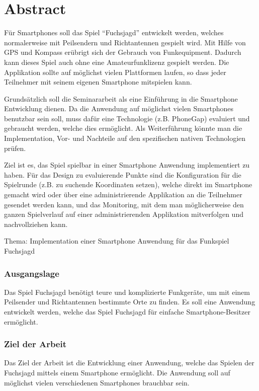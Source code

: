 
\newpage
\section{Abstract} %
\label{sec:Abstract}
Für Smartphones soll das Spiel "`Fuchsjagd"' entwickelt werden, welches normalerweise mit Peilsendern und Richtantennen gespielt wird. Mit Hilfe von GPS und Kompass erübrigt sich der Gebrauch von Funkequipment.
Dadurch kann dieses Spiel auch ohne eine Amateurfunklizenz gespielt werden. Die Applikation sollte auf möglichst vielen Plattformen laufen, so dass jeder Teilnehmer mit seinem eigenen Smartphone mitspielen kann.

Grundsätzlich soll die Seminararbeit als eine Einführung in die Smartphone Entwicklung dienen. Da die Anwendung auf möglichst vielen Smartphones benutzbar sein soll, muss dafür eine Technologie (z.B. PhoneGap) evaluiert und gebraucht werden, welche dies ermöglicht. Als Weiterführung könnte man die Implementation, Vor- und Nachteile auf den spezifischen nativen Technologien prüfen.  

Ziel ist es, das Spiel spielbar in einer Smartphone Anwendung implementiert zu haben. Für das Design zu evaluierende Punkte sind die Konfiguration für die Spielrunde (z.B. zu suchende Koordinaten setzen), welche direkt im Smartphone gemacht wird oder über eine administrierende Applikation an die Teilnehmer gesendet werden kann, und das Monitoring, mit dem man möglicherweise den ganzen Spielverlauf auf einer administrierenden Applikation mitverfolgen und nachvollziehen kann.

Thema: Implementation einer Smartphone Anwendung für das Funkspiel Fuchsjagd

\subsubsection{Ausgangslage} %
\label{ssub:Ausgangslage}
Das Spiel Fuchsjagd benötigt teure und komplizierte Funkgeräte, um mit einem Peilsender und Richtantennen bestimmte Orte zu finden. Es soll eine Anwendung entwickelt werden, welche das Spiel Fuchsjagd für einfache Smartphone-Besitzer ermöglicht.

\subsubsection{Ziel der Arbeit} %
\label{ssub:Ziel der Arbeit}
Das Ziel der Arbeit ist die Entwicklung einer Anwendung, welche das Spielen der Fuchsjagd mittels einem Smartphone ermöglicht. Die Anwendung soll auf möglichst vielen verschiedenen Smartphones brauchbar sein.

